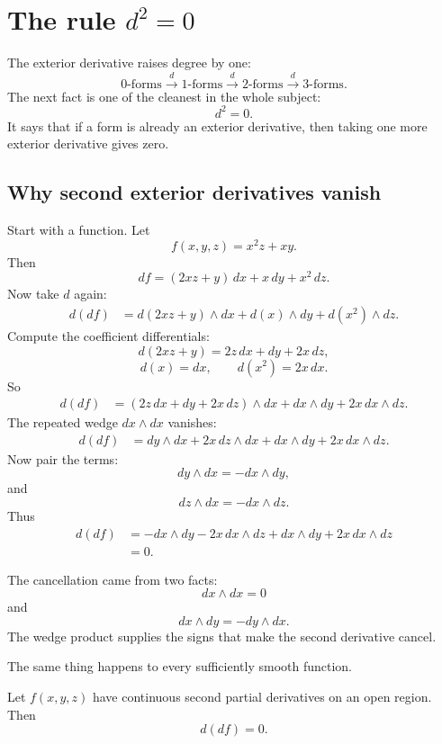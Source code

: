 \section{The rule \texorpdfstring{\(d^2=0\)}{d squared equals zero}}
\label{sec:17.4}

The exterior derivative raises degree by one:
\[
    0\text{-forms}
    \xrightarrow{\ d\ }
    1\text{-forms}
    \xrightarrow{\ d\ }
    2\text{-forms}
    \xrightarrow{\ d\ }
    3\text{-forms}.
\]
The next fact is one of the cleanest in the whole subject:
\[
\boxed{
    d^2=0.
}
\]
It says that if a form is already an exterior derivative, then taking one more exterior
derivative gives zero.

\subsection{Why second exterior derivatives vanish}

Start with a function.  Let
\[
    f(x,y,z)=x^2z+xy.
\]
Then
\[
    df=(2xz+y)\,dx+x\,dy+x^2\,dz.
\]
Now take \(d\) again:
\[
\begin{aligned}
d(df)
&=
d(2xz+y)\wedge dx
+
d(x)\wedge dy
+
d(x^2)\wedge dz.
\end{aligned}
\]
Compute the coefficient differentials:
\[
    d(2xz+y)=2z\,dx+dy+2x\,dz,
\]
\[
    d(x)=dx,
    \qquad
    d(x^2)=2x\,dx.
\]
So
\[
\begin{aligned}
d(df)
&=
(2z\,dx+dy+2x\,dz)\wedge dx
+
dx\wedge dy
+
2x\,dx\wedge dz.
\end{aligned}
\]
The repeated wedge \(dx\wedge dx\) vanishes:
\[
\begin{aligned}
d(df)
&=
dy\wedge dx+2x\,dz\wedge dx
+
dx\wedge dy
+
2x\,dx\wedge dz.
\end{aligned}
\]
Now pair the terms:
\[
    dy\wedge dx=-dx\wedge dy,
\]
and
\[
    dz\wedge dx=-dx\wedge dz.
\]
Thus
\[
\begin{aligned}
d(df)
&=
-dx\wedge dy-2x\,dx\wedge dz
+
dx\wedge dy
+
2x\,dx\wedge dz\\
&=
0.
\end{aligned}
\]

The cancellation came from two facts:
\[
    dx\wedge dx=0
\]
and
\[
    dx\wedge dy=-dy\wedge dx.
\]
The wedge product supplies the signs that make the second derivative cancel.

The same thing happens to every sufficiently smooth function.

\begin{theorem}[\(d(df)=0\)]
Let \(f(x,y,z)\) have continuous second partial derivatives on an open region.  Then
\[
\boxed{
    d(df)=0.
}
\]
\end{theorem}


